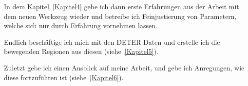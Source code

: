 In dem Kapitel~\ref{Kapitel4} gebe ich dann erste Erfahrungen aus der Arbeit mit dem neuen Werkzeug wieder und betreibe ich Feinjustierung von Parametern, welche sich nur durch Erfahrung vornehmen lassen.

Endlich beschäftige ich mich mit den DETER-Daten und erstelle ich die bewegenden Regionen aus diesen (siehe~\ref{Kapitel5}).

Zuletzt gebe ich einen Ausblick auf meine Arbeit, und gebe ich Anregungen, wie diese fortzuführen ist (siehe~\ref{Kapitel6}).




